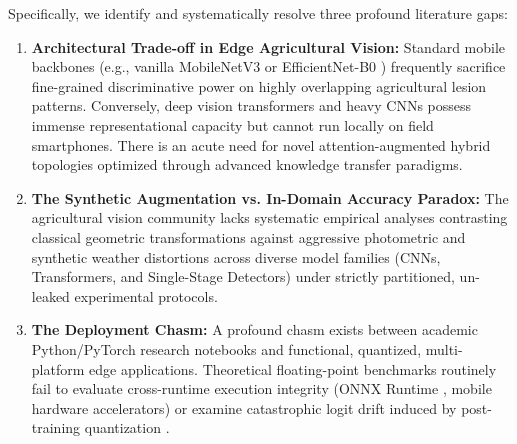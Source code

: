 \documentclass[journal,10pt,twocolumn]{IEEEtran}
\begin{document}
Specifically, we identify and systematically resolve three profound literature gaps:
\begin{enumerate}[leftmargin=*]
    \item \textbf{Architectural Trade-off in Edge Agricultural Vision:} Standard mobile backbones (e.g., vanilla MobileNetV3 \cite{howard2019searching} or EfficientNet-B0 \cite{tan2019efficientnet}) frequently sacrifice fine-grained discriminative power on highly overlapping agricultural lesion patterns. Conversely, deep vision transformers and heavy CNNs possess immense representational capacity but cannot run locally on field smartphones. There is an acute need for novel attention-augmented hybrid topologies optimized through advanced knowledge transfer paradigms.
    \item \textbf{The Synthetic Augmentation vs. In-Domain Accuracy Paradox:} The agricultural vision community lacks systematic empirical analyses contrasting classical geometric transformations against aggressive photometric and synthetic weather distortions across diverse model families (CNNs, Transformers, and Single-Stage Detectors) under strictly partitioned, un-leaked experimental protocols.
    \item \textbf{The Deployment Chasm:} A profound chasm exists between academic Python/PyTorch research notebooks and functional, quantized, multi-platform edge applications. Theoretical floating-point benchmarks routinely fail to evaluate cross-runtime execution integrity (ONNX Runtime \cite{onnx2019}, mobile hardware accelerators) or examine catastrophic logit drift induced by post-training quantization \cite{krishnamoorthi2018quantizing}.
\end{enumerate}
\end{document}
